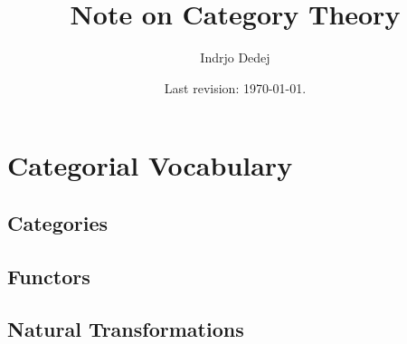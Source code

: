 




\title{Note on Category Theory}
\author{Indrjo Dedej}
\date{Last revision: \today{}.}



\maketitle
\tableofcontents

\part{Categorial Vocabulary}

\chapter{Categories}

\chapter{Functors}

\chapter{Natural Transformations}



